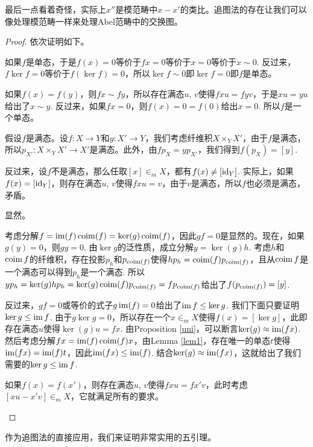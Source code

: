 最后一点看着奇怪，实际上$x''$是模范畴中$x-x'$的类比。追图法的存在让我们可以像处理模范畴一样来处理Abel范畴中的交换图。

\begin{proof}
依次证明如下。
\begin{compactenum}[~~~(1)]
\item 如果$f$是单态，于是$f(x)=0$等价于$fx=0$等价于$x=0$等价于$x\sim 0$. 反过来，$f\ker f=0$等价于$f(\ker f)=0$，所以$\ker f\sim 0$即$\ker f=0$即$f$是单态。

\item 如果$f(x)=f(y)$，则$fx\sim fy$，所以存在满态$u$, $v$使得$fxu=fyv$，于是$xu=yu$给出了$x\sim y$. 反过来，如果$fx=0$，则$f(x)=0=f(0)$给出$x=0$. 所以$f$是一个单态。

\item 假设$f$是满态。设$f:X\to Y$和$y:X'\to Y$，我们考虑纤维积$X\times_Y X'$，由于$f$是满态，所以$p_{X'}:X\times_Y X'\to X'$是满态。此外，由$fp_X=yp_{X'}$，我们得到$f(p_X)=[y]$. 

反过来，设$f$不是满态，那么任取$[x]\in_m X$，都有$f(x)\neq [\operatorname{id}_Y]$. 实际上，如果$f(x)=[\operatorname{id}_Y]$，则存在满态$u$, $v$使得$fxu=v$，由于$v$是满态，所以$f$也必须是满态，矛盾。

\item 显然。

\item 考虑分解$f=\operatorname{im}(f)\operatorname{coim}(f)=\ker(g)\operatorname{coim}(f)$，因此$gf=0$是显然的。现在，如果$g(y)=0$，则$gy=0$. 由$\ker g$的泛性质，成立分解$y=\ker(g)h$. 考虑$h$和$\operatorname{coim} f$的纤维积，存在投影$p_h$和$p_{\operatorname{coim}(f)}$使得$hp_h=\operatorname{coim}(f)p_{\operatorname{coim}(f)}$，且从$\operatorname{coim} f$是一个满态可以得到$p_h$是一个满态. 所以$yp_h=\ker(g)hp_h=\ker(g)\operatorname{coim}(f)p_{\operatorname{coim}(f)}=fp_{\operatorname{coim}(f)}$给出了$f(p_{\operatorname{coim}(f)})=[y]$.

反过来，$gf=0$或等价的式子$g\operatorname{im}(f)=0$给出了$\operatorname{im} f \leq \ker g$. 我们下面只要证明$\ker g \leq \operatorname{im} f$. 由于$g\ker g=0$，所以存在一个$x\in_m X$使得$f(x)=[\ker g]$，此即存在满态$u$使得$\ker(g)u=fx$. 由Proposition \ref{uni}，可以断言$\ker(g)\approx \operatorname{im}(fx)$. 然后考虑分解$fx=\operatorname{im}(f)\operatorname{coim}(f)x$，由Lemma \ref{lem1}，存在唯一的单态$t$使得$\operatorname{im}(fx)=\operatorname{im}(f)t$，因此$\operatorname{im}(fx)\leq \operatorname{im}(f)$. 结合$\ker(g)\approx \operatorname{im}(fx)$，这就给出了我们需要的$\ker g\leq \operatorname{im} f$.

\item 如果$f(x)=f(x')$，则存在满态$u$, $v$使得$fxu=fx'v$，此时考虑$[xu-x'v]\in_m X$，它就满足所有的要求。
\end{compactenum}
\end{proof}

作为追图法的直接应用，我们来证明非常实用的五引理。

